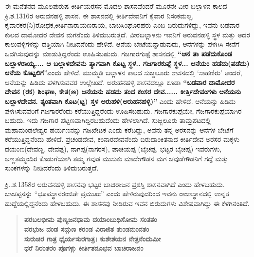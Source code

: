 ಈ ಮನೆತನದ ಮೂಲಪುರುಷ ಕೀರ್ತಿಯರಸನ ಮೊದಲ ಶಾಸನವೆಂದರೆ ಮೂರನೇ ವೀರ ಬಲ್ಲಾಳನ ಕಾಲದ ಕ್ರಿ.ಶ.1316ರ ಅರುವನಹಳ್ಳಿ ಶಾಸನ. ಈ ಶಾಸನದಲ್ಲಿ ಕೀರ್ತಿದೇವನಿಗೆ ಕೈವಾರ ನಿಸಂಕಮಲ್ಲ, ಕೈವಾರಕರ(ನಿ)ರೋಧಕ,\break ಕೀರ್ತಿನಾರಾಯಣರಾಯ, ಬಾಬಸಿಂಘೂರಹರು ಎಂಬ ಬಿರುದುಗಳಿದ್ದು, ಇವನು ಬಡವಾರ ಕುಲದ ದಾಮೋದರ ದೇವನ ಮಗನೆಂದು ತಿಳಿದುಬರುತ್ತದೆ. ವೀರಬಲ್ಲಾಳನು ಇವನಿಗೆ ಅರುವನಹಳ್ಳಿ ಸ್ಥಳ ಮತ್ತು ಅದರ ಕಾಲುವಳ್ಳಿಗಳನ್ನು ದತ್ತಿಯಾಗಿ ನೀಡಿದನೆಂದು ಹೇಳಿದೆ. ಆನೆಯ ಬೇಟೆಯನ್ನಾಡುವುದು, ಆನೆಗಳನ್ನು ಪಳಗಿಸಿ ಸೇನೆಗೆ ಒದಗಿಸುವುದನ್ನು ಮಾಡುತ್ತಿದ್ದರೆಂದು ಊಹಿಸಬಹುದು. ಗಜಗಾರಗುಪ್ಪೆ ಶಾಸನದಲ್ಲಿ \textbf{“ಆನೆ ತಾ ಪಡೆದುಕೊಂಡ ಬಲ್ಲಾಳರಾಯ್ಯ.... ಆ ಬಲ್ಲಾಳದೇವನು ತ್ಯಾಗವಾಗಿ ಕೊಟ್ಟ ಸ್ಥಳ.. ಗಜಗಾರಕುಪ್ಪೆ ಸ್ಥಳ... ಆನೆಯಂ ಹಡೆದು(ಪಡೆದು) ಆನೆಯ ಕೊಟ್ಟಲಿಗೆ}”ಎಂದು ಹೇಳಿದೆ. ಮುಮ್ಮಡಿ ಬಲ್ಲಾಳನ ಕಾಲದ ಸುಜ್ಜಲೂರು ಶಾಸನದಲ್ಲಿ ‘ಸಾಹಣಿರು’ ಅಂದರೆ, ಆನೆಯನ್ನು ಹಿಡಿದು ಪಳಗಿಸುವವರ ಉಲ್ಲೇಖದೆ. ಅರುಹನಹಳ್ಳಿ ಶಾಸನದಲ್ಲೂ ಕೂಡಾ \textbf{“ಬಡವಾರ ದಾಮೋದರ ದೇವನ (ರಕ) ಶಿಂಘಣ, ಕೇತ(ಣ) ಆನೆಯನು ಹಡದು ತಂದ ಕಂಸರ ದೇವ...... ಕೀರ್ತ್ತಿದೇವಂಗಳು ಆನೆಯನು ಬಲ್ಲಾಳದೇವನ. ತ್ಯಂತವಾಗಿ ಕೊಟ(ಟ್ಟ) ಸ್ತಳ ಅರುಹಳಿ(ಅರುಹನಹಳ್ಳಿ)”} ಎಂದು ಹೇಳಿದೆ. ಆನೆಯನ್ನು ಹಿಡಿದು ಪಳಗಿಸುವವರಿಗೆ ಗಜಗಾರರೆಂದು ಕರೆಯುತ್ತಿದ್ದರೆಂದು ಊಹಿಸಬಹುದು. ಗಜಗಾರಕುಪ್ಪೆಯೇ, ಗೆಜಗಾರಕುಪ್ಪೆಯಾಗಿರ ಬಹುದು. ಇದು ಗಜಗಾರ ಪಟ್ಟಣವಾಗಿದ್ದಿರಬಹುದೆಂದು ಹೇಳಲಾಗಿದೆ. ಸುಜ್ಜಲೂರು ತಾಮ್ರಪಟದಲ್ಲಿ ಮಹಾಮಂಡಲೇಶ್ವರ ಹರ್ಯಣನನ್ನು ಗಜಖೇಟಕ ಎಂದು ಕರೆದಿದ್ದು, ಅವನು ತನ್ನ ಅರಸನನ್ನು ಆನೆಗಳ ಬೇಟೆಗೆ ಕರೆಯುತ್ತಿದ್ದನೆಂದು ಹೇಳಿದೆ. ಪ್ರಚಂಡದೇವ, ಕಂನಾರದೇವನೆಂದು ಬಿರುದಾಂಕಿತನಾದ ಕೀರ್ತಿದೇವ ಅರಸರ ಮಕ್ಕಳು ದಯಂಣ(ದೇವಣ್ಣ, ದೇವಪ್ಪ), ನಾಗಪ್ಪ(ನಾಗರಸ), ಪಾಚಯಪ್ಪ (ಬೈಚಪ್ಪ, ಭಟ್ಟರ ಬೈಚಪ್ಪ) ಇವರುಗಳು, ಅಣ್ಣತಮ್ಮಂದಿರ ಕೊಡುಗೆಯಾಗಿ ತಮ್ಮ ಗವುಡ ಮುಸುಕು ಮಾದೇಗೌಡನ ಮಗ ಚವುಡೆಗೌಡನಿಗೆ ಗದ್ದೆ ಮತ್ತು ಸುಂಕಗಳನ್ನು ನೀಡಿದರೆಂದು ತಿಳಿದುಬರುತ್ತದೆ.

ಕ್ರಿ..ಶ.1358ರ ಅರುವನಹಳ್ಳಿ ಶಾಸನವು ಭಟ್ಟರ ಬಾಚಿರಾಜನ ಪ್ರಶಸ್ತಿ ಶಾಸನವಾಗಿದೆ ಎಂದು ಹೇಳಬಹುದು. ಬಾಚಪ್ಪನನ್ನು “ಭೂಪಸ್ಥಾನರಂಜಿತೇ ಪ್ರಮುಖಃ” ಎಂದು ಹೇಳಿರುವುದರಿಂದ ಇವನು ರಾಜಾಸ್ಥಾನದಲ್ಲಿ ಉನ್ನತ ಹುದ್ದೆಯಲ್ಲಿದ್ದ\-ನೆಂದು ಹೇಳಬಹುದು. ಈ ಶಾಸನವು ನೀಡಿರುವ ಇವನ ಬಿರುದುಗಳು ವಿಶೇಷವಾಗಿದ್ದು ಈ ಕೆಳಗಿನಂತಿದೆ.

\begin{verse}
\textbf{ಪರಬಲಭೀಮ ಪುಣ್ಯಜನಧಾಮ ದಯಾಂಬುಧಿಸೋಮ ಸಂತತಂ} \\\textbf{ವರಭುಜ ದಂಡ ಸದ್ಗುಣ ಕರಂಡ ವಿರಾಜಿತ ತುಂಡನುಂನತಂ} \\\textbf{ ಸುರುಚಿರ ಗಾತ್ರ ಧೈರ್ಯಸುರಗಾತ್ರ। ಕುಶೇಶೆಯನ ನೇತ್ರನೆಂದುಮೀ} \\\textbf{ಧರೆ ನಿರಂತರಂ ಪೊಗಳ್ಗು ಕೀರ್ತಿತನೂಭವ ಬಾಚಿರಾಜನಂ}
\end{verse}

